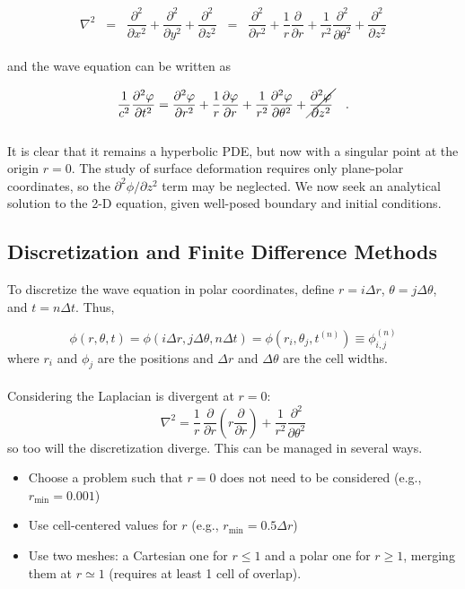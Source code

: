 \documentclass{homework}
\begin{document}
\[ \nabla^2 \;\; = \;\; \frac{\partial^2}{\partial x^2} + \frac{\partial^2}{\partial y^2} + \frac{\partial^2}{\partial z^2} \;\; = \;\; \frac{\partial^2}{\partial r^2} + \frac{1}{r} \frac{\partial}{\partial r} + \frac{1}{r^2} \frac{\partial^2}{\partial \theta^2} + \frac{\partial^2}{\partial z^2} \]
\\ \noindent
and the wave equation can be written as

\[ \frac{1}{c^2} \frac{\partial^2 \phi }{\partial t^2 } = \frac{\partial^2 \phi }{\partial r^2 } + \frac{1}{r} \frac{\partial \phi }{\partial r} + \frac{1}{r^2 } \frac{\partial^2 \phi }{\partial \theta^2 } + \cancel{\frac{\partial^2 \phi }{\partial z^2 }} \quad .\]
\\ \noindent
It is clear that it remains a hyperbolic PDE, but now with a singular point at the origin $r = 0$. The study of surface deformation requires only plane-polar coordinates, so the $\partial^2 \phi / \partial z^2$ term may be neglected. We now seek an analytical solution to the 2-D equation, given well-posed boundary and initial conditions.

\newpage
\subsection{Discretization and Finite Difference Methods}

To discretize the wave equation in polar coordinates, define $r = i \Delta r$, $\theta = j \Delta \theta$, and $t = n \Delta t$. Thus,

$$ \phi \left(r, \theta, t \right)= \phi \left(i \Delta r, j \Delta \theta, n \Delta t \right) = \phi \left(r_i, \theta_j, t^{\left(n\right)} \right) \equiv \phi_{i,j}^{\left(n\right)} $$
where $r_i$ and $\phi_j$ are the positions and $\Delta r$ and $\Delta \theta$ are the cell widths.
\\ \\ \noindent
Considering the Laplacian is divergent at $r=0$:
$$ \nabla^2 = \frac{1}{r} \, \frac{\partial}{\partial r} \left(r \frac{\partial}{\partial r}\right)+ \frac{1}{r^2} \frac{\partial^2}{\partial \theta^2} $$
so too will the discretization diverge. This can be managed in several ways.
\begin{itemize}
    \item Choose a problem such that $r=0$ does not need to be considered (e.g., $r_{\textrm{min}} = 0.001$)
    \item Use cell-centered values for $r$ (e.g., $r_{\textrm{min}} = 0.5 \Delta r$)
    \item Use two meshes: a Cartesian one for $r  \leq 1$ and a polar one for $r \geq 1$, merging them at $r \simeq 1 $ (requires at least 1 cell of overlap).
\end{itemize}
\end{document}
